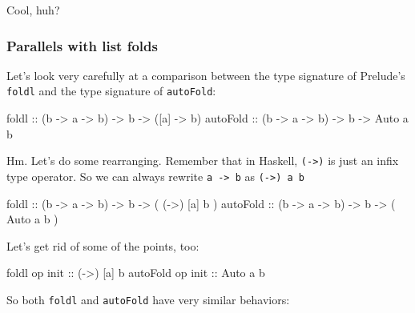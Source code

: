 \documentclass[]{article}
\newenvironment{Shaded}{}{}
\newcommand{\DataTypeTok}[1]{\textcolor[rgb]{0.56,0.13,0.00}{{#1}}}
\newcommand{\OtherTok}[1]{\textcolor[rgb]{0.00,0.44,0.13}{{#1}}}
\newcommand{\NormalTok}[1]{{#1}}
\begin{document}
Cool, huh?

\subsubsection{Parallels with list
folds}\label{parallels-with-list-folds}

Let's look very carefully at a comparison between the type signature of
Prelude's \texttt{foldl} and the type signature of \texttt{autoFold}:

\begin{Shaded}
\begin{Highlighting}[]
\NormalTok{foldl}\OtherTok{      ::} \NormalTok{(b }\OtherTok{->} \NormalTok{a }\OtherTok{->} \NormalTok{b) }\OtherTok{->} \NormalTok{b }\OtherTok{->} \NormalTok{([a] }\OtherTok{->} \NormalTok{b)}
\OtherTok{autoFold   ::} \NormalTok{(b }\OtherTok{->} \NormalTok{a }\OtherTok{->} \NormalTok{b) }\OtherTok{->} \NormalTok{b }\OtherTok{->}  \DataTypeTok{Auto} \NormalTok{a b}
\end{Highlighting}
\end{Shaded}

Hm. Let's do some rearranging. Remember that in Haskell,
\texttt{(-\textgreater{})} is just an infix type operator. So we can
always rewrite \texttt{a\ -\textgreater{}\ b} as
\texttt{(-\textgreater{})\ a\ b}

\begin{Shaded}
\begin{Highlighting}[]
\NormalTok{foldl}\OtherTok{      ::} \NormalTok{(b }\OtherTok{->} \NormalTok{a }\OtherTok{->} \NormalTok{b) }\OtherTok{->} \NormalTok{b }\OtherTok{->} \NormalTok{( (}\OtherTok{->}\NormalTok{) [a] b )}
\OtherTok{autoFold   ::} \NormalTok{(b }\OtherTok{->} \NormalTok{a }\OtherTok{->} \NormalTok{b) }\OtherTok{->} \NormalTok{b }\OtherTok{->} \NormalTok{( }\DataTypeTok{Auto}  \NormalTok{a  b )}
\end{Highlighting}
\end{Shaded}

Let's get rid of some of the points, too:

\begin{Shaded}
\begin{Highlighting}[]
\NormalTok{foldl    op}\OtherTok{ init  ::} \NormalTok{(}\OtherTok{->}\NormalTok{) [a] b}
\NormalTok{autoFold op}\OtherTok{ init  ::} \DataTypeTok{Auto}  \NormalTok{a  b}
\end{Highlighting}
\end{Shaded}

So both \texttt{foldl} and \texttt{autoFold} have very similar
behaviors:
\end{document}
